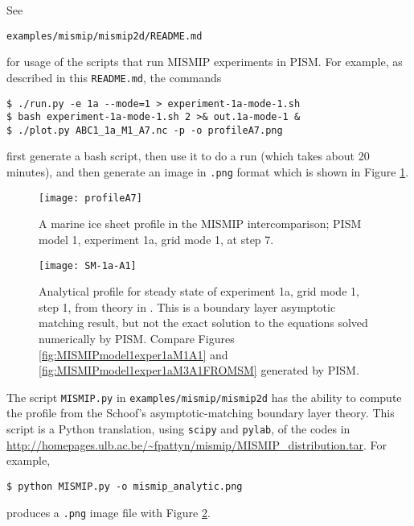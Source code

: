 See

  \centerline{\texttt{examples/mismip/mismip2d/README.md}}

\noindent for usage of the scripts that run MISMIP experiments in PISM.  For example, as described in this \texttt{README.md}, the commands

\begin{verbatim}
$ ./run.py -e 1a --mode=1 > experiment-1a-mode-1.sh
$ bash experiment-1a-mode-1.sh 2 >& out.1a-mode-1 &
$ ./plot.py ABC1_1a_M1_A7.nc -p -o profileA7.png
\end{verbatim}

\noindent first generate a bash script, then use it to do a run (which takes about 20 minutes), and then generate an image in \texttt{.png} format which is shown in Figure \ref{fig:MISMIPmodel1exper1aM1A7}.
 
\begin{figure}[ht]
\centering
\texttt{[image: profileA7]}
\caption{A marine ice sheet profile in the MISMIP intercomparison; PISM model 1, experiment 1a, grid mode 1, at step 7.}
\label{fig:MISMIPmodel1exper1aM1A7}
\end{figure}

\begin{figure}[ht]
\centering
\texttt{[image: SM-1a-A1]}
\caption{Analytical profile for steady state of experiment 1a, grid mode 1, step 1, from theory in \cite{SchoofMarine1}.  This is a boundary layer asymptotic matching result, but not the exact solution to the equations solved numerically by PISM. Compare Figures \ref{fig:MISMIPmodel1exper1aM1A1} and \ref{fig:MISMIPmodel1exper1aM3A1FROMSM} generated by PISM.}
\label{fig:SMexper1aM1A1}
\end{figure}

The script \texttt{MISMIP.py} in \texttt{examples/mismip/mismip2d} has the ability to compute the profile from the Schoof's \cite{SchoofMarine1} asymptotic-matching boundary layer theory.  This script is a Python translation, using \texttt{scipy} and \texttt{pylab}, of the \Matlab codes in \url{http://homepages.ulb.ac.be/~fpattyn/mismip/MISMIP_distribution.tar}.  For example,

\begin{verbatim}
$ python MISMIP.py -o mismip_analytic.png
\end{verbatim}

\noindent produces a \verb|.png| image file with Figure \ref{fig:SMexper1aM1A1}.

